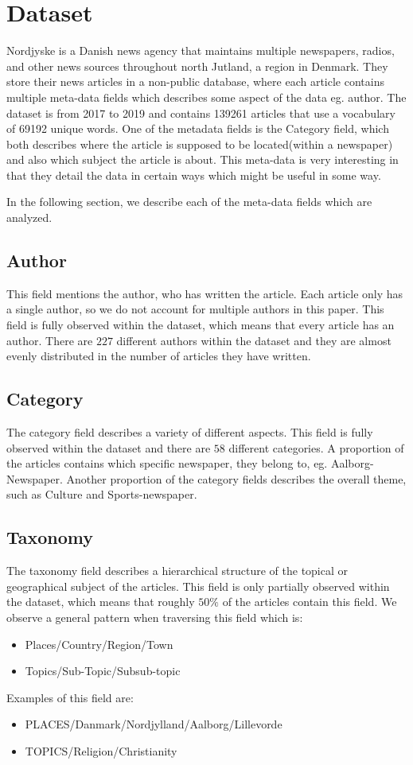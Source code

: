 \section{Dataset}
Nordjyske is a Danish news agency that maintains multiple newspapers, radios, and other news sources throughout north Jutland, a region in Denmark.
They store their news articles in a non-public database, where each article contains multiple meta-data fields which describes some aspect of the data eg. author.
The dataset is from 2017 to 2019 and contains 139261 articles that use a vocabulary of 69192 unique words.
One of the metadata fields is the Category field, which both describes where the article is supposed to be located(within a newspaper) and also which subject the article is about.
This meta-data is very interesting in that they detail the data in certain ways which might be useful in some way.

In the following section, we describe each of the meta-data fields which are analyzed.

\subsection{Author}
This field mentions the author, who has written the article.
Each article only has a single author, so we do not account for multiple authors in this paper.
This field is fully observed within the dataset, which means that every article has an author.
There are $227$ different authors within the dataset and they are almost evenly distributed in the number of articles they have written.

\subsection{Category}
The category field describes a variety of different aspects. 
This field is fully observed within the dataset and there are $58$ different categories.
A proportion of the articles contains which specific newspaper, they belong to, eg. Aalborg-Newspaper.
Another proportion of the category fields describes the overall theme, such as Culture and Sports-newspaper.

\subsection{Taxonomy}
The taxonomy field describes a hierarchical structure of the topical or geographical subject of the articles.
This field is only partially observed within the dataset, which means that roughly $50\%$ of the articles contain this field.
We observe a general pattern when traversing this field which is:
\begin{itemize}
	\item Places/Country/Region/Town
	\item Topics/Sub-Topic/Subsub-topic
\end{itemize}
Examples of this field are:
\begin{itemize}
	\item PLACES/Danmark/Nordjylland/Aalborg/Lillevorde
	\item TOPICS/Religion/Christianity
\end{itemize}
